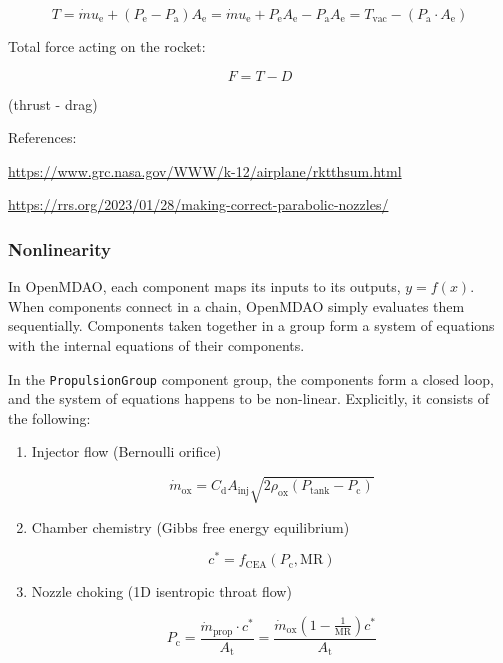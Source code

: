 \documentclass[fleqn]{article}
\begin{document}
\begin{equation*}
T
= \dot{m} u_\text{e} + (P_\text{e} - P_\text{a}) A_\text{e}
= \dot{m} u_\text{e} + P_\text{e} A_\text{e} - P_\text{a} A_\text{e}
= T_\text{vac} - (P_\text{a} \cdot A_\text{e})
\end{equation*}

Total force acting on the rocket:

\begin{equation*}
F = T - D
\end{equation*}

(thrust - drag)

References:

\url{https://www.grc.nasa.gov/WWW/k-12/airplane/rktthsum.html}

\url{https://rrs.org/2023/01/28/making-correct-parabolic-nozzles/}
\subsubsection{Nonlinearity}
\label{sec:orgb3b6cde}

In OpenMDAO, each component maps its inputs to its outputs, \(y = f(x)\). When
components connect in a chain, OpenMDAO simply evaluates them
sequentially. Components taken together in a group form a system of equations
with the internal equations of their components.

In the \texttt{PropulsionGroup} component group, the components form a closed loop, and
the system of equations happens to be non-linear. Explicitly, it consists of the
following:

\begin{enumerate}
\item Injector flow (Bernoulli orifice)

\begin{equation*}
\dot{m}_\text{ox}
= C_\text{d} A_\text{inj}
  \sqrt{2\rho_\text{ox} (P_\text{tank} - P_\text{c})}
\end{equation*}

\item Chamber chemistry (Gibbs free energy equilibrium)

\begin{equation*}
c^* = f_\text{CEA} (P_\text{c}, \mathrm{MR})
\end{equation*}

\item Nozzle choking (1D isentropic throat flow)

\begin{equation*}
P_\text{c}
= \frac{\dot{m}_\text{prop} \cdot c^*}{A_\text{t}}
= \frac{\dot{m}_\text{ox} \left(1 - \frac{1}{\mathrm{MR}}\right)c^*}
       {A_\text{t}}
\end{equation*}
\end{enumerate}
\end{document}
